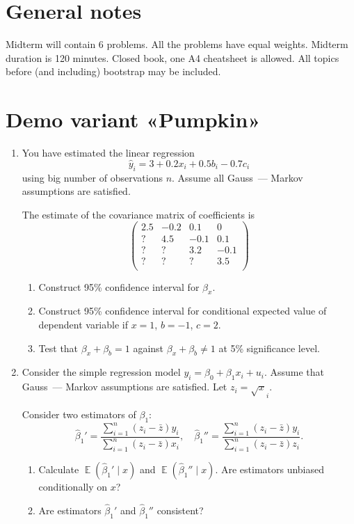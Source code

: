 \documentclass[12pt]{article}
\DeclareMathOperator{\E}{\mathbb{E}}
\newcommand{\hb}{\hat\beta}
\begin{document}
\section*{General notes}

Midterm will contain 6 problems. 
All the problems have equal weights. 
Midterm duration is 120 minutes. 
Closed book, one A4 cheatsheet is allowed.
All topics before (and including) bootstrap may be included. 

\section*{Demo variant «Pumpkin»}
\begin{enumerate}
    \item You have estimated the linear regression 
    \[
    \hat y_i  = 3 + 0.2 x_i + 0.5 b_i - 0.7 c_i
    \]
    using big number of observations $n$. 
    Assume all Gauss~— Markov assumptions are satisfied. 

    The estimate of the covariance matrix of coefficients is 
    \[
    \begin{pmatrix}
        2.5 & -0.2 & 0.1  & 0 \\
        ?   &  4.5 & -0.1 & 0.1 \\
        ?   &   ?  & 3.2  & -0.1 \\
        ?   &   ?  &  ?   &  3.5 \\       
    \end{pmatrix}
    \]
    \begin{enumerate}
        \item Construct 95\% confidence interval for $\beta_x$.
        \item Construct 95\% confidence interval for conditional expected value of dependent variable if $x = 1$, $b = -1$, $c = 2$.
        \item Test that $\beta_x + \beta_b = 1$ against $\beta_ x + \beta_b \neq 1$ at 5\% significance level.
    \end{enumerate}


    \item Consider the simple regression model $y_i = \beta_0 + \beta_1 x_i + u_i$.
    Assume that Gauss~— Markov assumptions are satisfied.
    Let $z_i = \sqrt{x}_i$.

    Consider two estimators of $\beta_1$:
    \[
    \hb_1' = \frac{\sum_{i=1}^n(z_i - \bar z)y_i}{\sum_{i=1}^n(z_i - \bar z)x_i}, \quad \hb_1'' = \frac{\sum_{i=1}^n(z_i - \bar z)y_i}{\sum_{i=1}^n(z_i - \bar z)z_i}.
    \]
    \begin{enumerate}
        \item Calculate $\E(\hb_1' \mid x)$ and $\E(\hb_1'' \mid x)$. Are estimators unbiased conditionally on $x$?
        \item Are estimators $\hb_1'$ and $\hb_1''$ consistent?
    \end{enumerate}



\end{enumerate}
\end{document}
